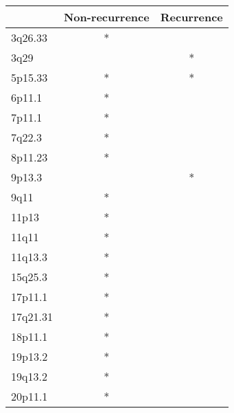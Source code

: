 \begin{tabular}{lcc}
\toprule
{} & Non-recurrence & Recurrence \\
\midrule
3q26.33  &              * &            \\
3q29     &                &          * \\
5p15.33  &              * &          * \\
6p11.1   &              * &            \\
7p11.1   &              * &            \\
7q22.3   &              * &            \\
8p11.23  &              * &            \\
9p13.3   &                &          * \\
9q11     &              * &            \\
11p13    &              * &            \\
11q11    &              * &            \\
11q13.3  &              * &            \\
15q25.3  &              * &            \\
17p11.1  &              * &            \\
17q21.31 &              * &            \\
18p11.1  &              * &            \\
19p13.2  &              * &            \\
19q13.2  &              * &            \\
20p11.1  &              * &            \\
\bottomrule
\end{tabular}

